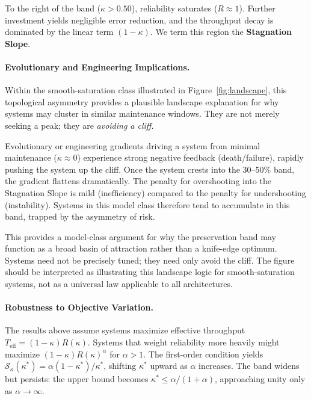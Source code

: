 \documentclass[11pt,twocolumn]{article}
\begin{document}
To the right of the band ($\kappa > 0.50$), reliability saturates ($R \approx 1$). Further investment yields negligible error reduction, and the throughput decay is dominated by the linear term $(1-\kappa)$. We term this region the \textbf{Stagnation Slope}.

\paragraph{Evolutionary and Engineering Implications.}
Within the smooth-saturation class illustrated in Figure~\ref{fig:landscape}, this topological asymmetry provides a plausible landscape explanation for why systems may cluster in similar maintenance windows. They are not merely seeking a peak; they are \emph{avoiding a cliff}.

Evolutionary or engineering gradients driving a system from minimal maintenance ($\kappa \approx 0$) experience strong negative feedback (death/failure), rapidly pushing the system up the cliff. Once the system crests into the 30--50\% band, the gradient flattens dramatically. The penalty for overshooting into the Stagnation Slope is mild (inefficiency) compared to the penalty for undershooting (instability). Systems in this model class therefore tend to accumulate in this band, trapped by the asymmetry of risk.

This provides a model-class argument for why the preservation band may function as a broad basin of attraction rather than a knife-edge optimum. Systems need not be precisely tuned; they need only avoid the cliff. The figure should be interpreted as illustrating this landscape logic for smooth-saturation systems, not as a universal law applicable to all architectures.

\paragraph{Robustness to Objective Variation.}
The results above assume systems maximize effective throughput $T_{\mathrm{eff}} = (1-\kappa)R(\kappa)$. Systems that weight reliability more heavily might maximize $(1-\kappa)R(\kappa)^\alpha$ for $\alpha > 1$. The first-order condition yields $\mathcal{S}_\kappa(\kappa^*) = \alpha(1-\kappa^*)/\kappa^*$, shifting $\kappa^*$ upward as $\alpha$ increases. The band widens but persists: the upper bound becomes $\kappa^* \le \alpha/(1+\alpha)$, approaching unity only as $\alpha \to \infty$.

\end{document}
